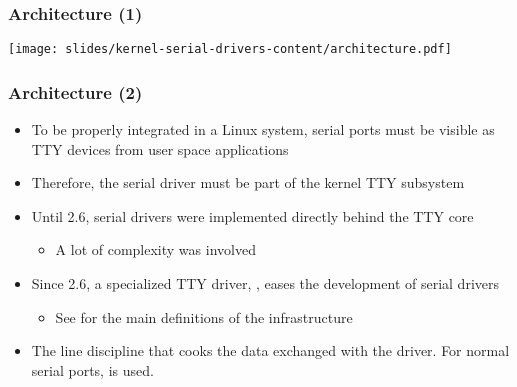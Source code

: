 \begin{frame}
  \frametitle{Architecture (1)}
  \begin{center}
    \texttt{[image: slides/kernel-serial-drivers-content/architecture.pdf]}
  \end{center}
\end{frame}

\begin{frame}
  \frametitle{Architecture (2)}
  \begin{itemize}
  \item To be properly integrated in a Linux system, serial ports must
    be visible as TTY devices from user space applications
  \item Therefore, the serial driver must be part of the kernel TTY
    subsystem
  \item Until 2.6, serial drivers were implemented directly behind the
    TTY core
    \begin{itemize}
    \item A lot of complexity was involved
    \end{itemize}
  \item Since 2.6, a specialized TTY driver, , eases
    the development of serial drivers
    \begin{itemize}
    \item See  for the main
      definitions of the  infrastructure
    \end{itemize}
  \item The line discipline that cooks the data exchanged with the
     driver. For normal serial ports,  is used.
  \end{itemize}
\end{frame}

